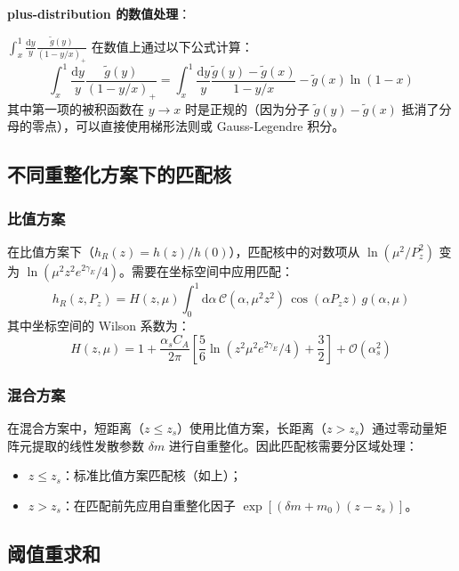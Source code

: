 \documentclass[11pt,a4paper]{ctexart}
\newcommand{\order}[1]{\mathcal{O}(#1)}
\begin{document}
\textbf{plus-distribution 的数值处理}：

$\int_x^1 \frac{\mathrm{d}y}{y} \frac{\tilde{g}(y)}{(1-y/x)_+}$ 在数值上通过以下公式计算：
\begin{equation}
\int_x^1 \frac{\mathrm{d}y}{y} \frac{\tilde{g}(y)}{(1-y/x)_+} =
\int_x^1 \frac{\mathrm{d}y}{y} \frac{\tilde{g}(y) - \tilde{g}(x)}{1-y/x} -
\tilde{g}(x) \ln(1-x)
\end{equation}
其中第一项的被积函数在 $y \to x$ 时是正规的（因为分子 $\tilde{g}(y) - \tilde{g}(x)$ 抵消了分母的零点），可以直接使用梯形法则或 Gauss-Legendre 积分。

\subsection{不同重整化方案下的匹配核}

\subsubsection{比值方案}

在比值方案下（$h_R(z) = h(z)/h(0)$），匹配核中的对数项从 $\ln(\mu^2/P_z^2)$ 变为 $\ln(\mu^2 z^2 e^{2\gamma_E}/4)$。需要在坐标空间中应用匹配：
\begin{equation}
h_R(z, P_z) = H(z, \mu) \int_0^1 \mathrm{d}\alpha \,
\mathcal{C}(\alpha, \mu^2 z^2) \, \cos(\alpha P_z z) \, g(\alpha, \mu)
\end{equation}
其中坐标空间的 Wilson 系数为：
\begin{equation}
H(z, \mu) = 1 + \frac{\alpha_s C_A}{2\pi}
\left[ \frac{5}{6} \ln(z^2 \mu^2 e^{2\gamma_E}/4) + \frac{3}{2} \right] + \order{\alpha_s^2}
\end{equation}

\subsubsection{混合方案}

在混合方案中，短距离（$z \le z_s$）使用比值方案，长距离（$z > z_s$）通过零动量矩阵元提取的线性发散参数 $\delta m$ 进行自重整化。因此匹配核需要分区域处理：
\begin{itemize}
  \item $z \le z_s$：标准比值方案匹配核（如上）；
  \item $z > z_s$：在匹配前先应用自重整化因子 $\exp[(\delta m + m_0)(z - z_s)]$。
\end{itemize}

\subsection{阈值重求和}
\end{document}
